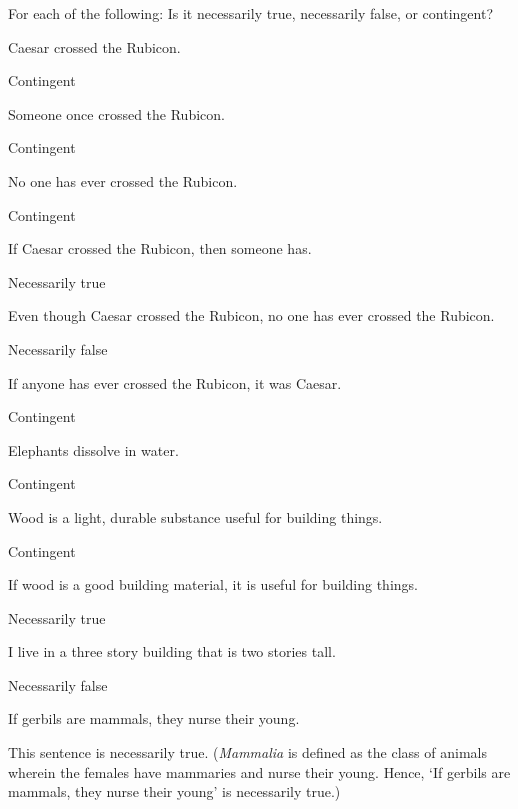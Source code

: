 \problempart
\label{pr.EnglishTautology}
For each of the following: Is it necessarily true, necessarily false, or contingent?
\begin{earg}
\item Caesar crossed the Rubicon.
\item[] Contingent\smallskip
\item Someone once crossed the Rubicon.
\item[] Contingent\smallskip
\item No one has ever crossed the Rubicon.
\item[] Contingent\smallskip
\item If Caesar crossed the Rubicon, then someone has.
\item[] Necessarily true\smallskip
\item Even though Caesar crossed the Rubicon, no one has ever crossed the Rubicon.
\item[] Necessarily false\smallskip
\item If anyone has ever crossed the Rubicon, it was Caesar.
\item[] Contingent\smallskip

\item Elephants dissolve in water.
\item[] Contingent\smallskip
\item Wood is a light, durable substance useful for building things.
\item[] Contingent\smallskip
\item If wood is a good building material, it is useful for building things.
\item[] Necessarily true\smallskip
\item I live in a three story building that is two stories tall.
\item[] Necessarily false\smallskip
\item If gerbils are mammals, they nurse their young.
\item[] This sentence is necessarily true. (\textit{Mammalia} is defined as the class of animals wherein the females have mammaries and nurse their young. Hence, `If gerbils are mammals, they nurse their young' is necessarily true.)
\end{earg}

\problempart 

